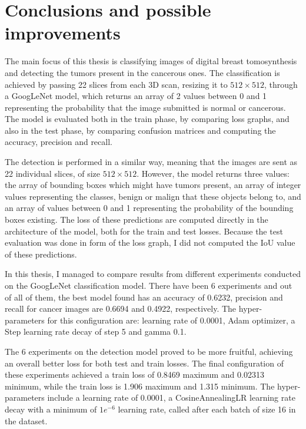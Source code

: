 \chapter{Conclusions and possible improvements}
\label{chap:ch6}

The main focus of this thesis is classifying images of digital breast tomosynthesis and detecting the tumors present in the cancerous ones. The classification is achieved by passing 22 slices from each 3D scan, resizing it to $512\times512$, through a GoogLeNet model, which returns an array of 2 values between 0 and 1 representing the probability that the image submitted is normal or cancerous. The model is evaluated both in the train phase, by comparing loss graphs, and also in the test phase, by comparing confusion matrices and computing the accuracy, precision and recall.

The detection is performed in a similar way, meaning that the images are sent as 22 individual slices, of size $512\times512$. However, the model returns three values: the array of bounding boxes which might have tumors present, an array of integer values representing the classes, benign or malign that these objects belong to, and an array of values between 0 and 1 representing the probability of the bounding boxes existing. The loss of these predictions are computed directly in the architecture of the model, both for the train and test losses. Because the test evaluation was done in form of the loss graph, I did not computed the IoU value of these predictions.

In this thesis, I managed to compare results from different experiments conducted on the GoogLeNet classification model. There have been 6 experiments and out of all of them, the best model found has an accuracy of 0.6232, precision and recall for cancer images are 0.6694 and 0.4922, respectively. The hyper-parameters for this configuration are: learning rate of 0.0001, Adam optimizer, a Step learning rate decay of step 5 and gamma 0.1.

The 6 experiments on the detection model proved to be more fruitful, achieving an overall better loss for both test and train losses. The final configuration of these experiments achieved a train loss of 0.8469 maximum and 0.02313 minimum, while the train loss is 1.906 maximum and 1.315 minimum. The hyper-parameters include a learning rate of 0.0001, a CosineAnnealingLR learning rate decay with a minimum of $1e^{-6}$ learning rate, called after each batch of size 16 in the dataset.

